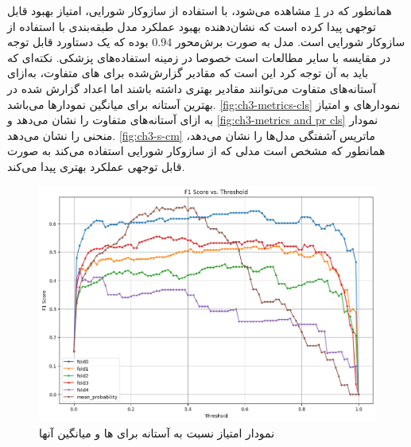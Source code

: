 همانطور که در 
\ref{fig:ch3-f1-vs-th-cls}
 مشاهده می‌شود، با استفاده از سازوکار شورایی، امتیاز  بهبود قابل توجهی پیدا کرده است که نشان‌دهنده بهبود عملکرد مدل طبقه‌بندی با استفاده از سازوکار شورایی است.
  مدل به صورت برش‌محور 
 $0.94$ 
 بوده که یک دستاورد قابل توجه در مقایسه با سایر مطالعات است خصوصا در زمینه استفاده‌های پزشکی. نکته‌ای که باید به آن توجه کرد این است که مقادیر گزارش‌شده برای
 های 
 متفاوت،‌ به‌ازای آستانه‌های متفاوت می‌توانند مقادیر بهتری داشته باشند اما اعداد گزارش شده در بهترین آستانه برای میانگین نمودارها می‌باشد.
\autoref{fig:ch3-metrics-cls}
نمودارهای
			 و امتیاز
			به ازای آستانه‌های متفاوت را نشان می‌دهد و 
\autoref{fig:ch3-metrics and pr cls}
نمودار منحنی 
را نشان می‌دهد.
\autoref{fig:ch3-s-cm}
ماتریس آشفتگی مدل‌ها را نشان می‌دهد،‌ همانطور که مشخص است مدلی که از سازوکار شورایی استفاده می‌کند به صورت قابل توجهی عملکرد بهتری پیدا می‌کند.
\begin{figure}[h]
\centering
\includegraphics[width=1.0\linewidth]{Images/Chapter3/f1-vs-th-cls}
\caption{نمودار امتیاز  نسبت به آستانه برای ها و میانگین آنها}
\label{fig:ch3-f1-vs-th-cls}

\end{figure}


